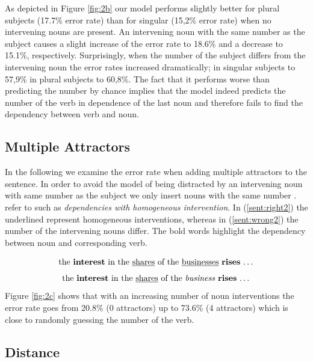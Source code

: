 \documentclass[twoside]{article}
\begin{document}
\begin{multicols}{2}
As depicted in Figure \ref{fig:2b} our model performs slightly better for plural subjects (17.7\% error rate) than for singular (15,2\% error rate) when no intervening nouns are present. An intervening noun with the same number as the subject causes a slight increase of the error rate to 18.6\% and a decrease to 15.1\%, respectively. Surprisingly, when the number of the subject differs from the intervening noun the error rates increased dramatically; in singular subjects to 57,9\% in plural subjects to 60,8\%. The fact that it performs worse than predicting the number by chance implies that the model indeed predicts the number of the verb in dependence of the last noun and therefore fails to find the dependency between verb and noun.

\subsection{Multiple Attractors}

In the following we examine the error rate when adding multiple attractors to the sentence. In order to avoid the model of being distracted by an intervening noun with same number as the subject we only insert nouns with the same number . \citep{Linzen2016} refer to such as  \textit{ dependencies with homogeneous intervention}. In (\ref{sent:right2}) the underlined represent homogeneous interventions, whereas in (\ref{sent:wrong2}) the number of the intervening nouns differ. The bold words highlight the dependency between noun and corresponding verb.

\begin{equation}
	\label{sent:right2}
	\textnormal{the \textbf{interest} in the \underline{shares} of the \underline{businesses} \textbf{rises} \dots}
\end{equation}
\begin{equation}
	\label{sent:wrong2}
	\textnormal{the \textbf{interest} in the \underline{shares} of the \textit{business} \textbf{rises} \dots}
\end{equation}
Figure \ref{fig:2c} shows that with an increasing number of noun interventions the error rate goes from 20.8\% (0 attractors) up to 73.6\% (4 attractors) which is close to randomly guessing the number of the verb. 

\subsection{Distance}


\end{multicols}
\end{document}
